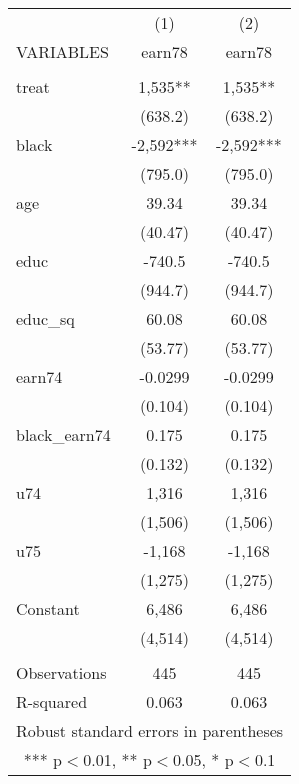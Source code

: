 \setlength{\pdfpagewidth}{8.5in} \setlength{\pdfpageheight}{11in}
\begin{tabular}{lcc} \hline
 & (1) & (2) \\
VARIABLES & earn78 & earn78 \\ \hline
 &  &  \\
treat & 1,535** & 1,535** \\
 & (638.2) & (638.2) \\
black & -2,592*** & -2,592*** \\
 & (795.0) & (795.0) \\
age & 39.34 & 39.34 \\
 & (40.47) & (40.47) \\
educ & -740.5 & -740.5 \\
 & (944.7) & (944.7) \\
educ\_sq & 60.08 & 60.08 \\
 & (53.77) & (53.77) \\
earn74 & -0.0299 & -0.0299 \\
 & (0.104) & (0.104) \\
black\_earn74 & 0.175 & 0.175 \\
 & (0.132) & (0.132) \\
u74 & 1,316 & 1,316 \\
 & (1,506) & (1,506) \\
u75 & -1,168 & -1,168 \\
 & (1,275) & (1,275) \\
Constant & 6,486 & 6,486 \\
 & (4,514) & (4,514) \\
 &  &  \\
Observations & 445 & 445 \\
 R-squared & 0.063 & 0.063 \\ \hline
\multicolumn{3}{c}{ Robust standard errors in parentheses} \\
\multicolumn{3}{c}{ *** p$<$0.01, ** p$<$0.05, * p$<$0.1} \\
\end{tabular}

